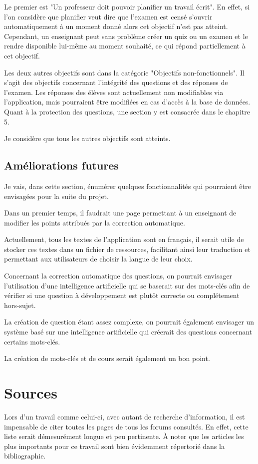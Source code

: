 Le premier est "Un professeur doit pouvoir planifier un travail écrit". En effet, si l'on considère que planifier veut dire que l'examen est censé s'ouvrir automatiquement à un moment donné alors cet objectif n'est pas atteint. Cependant, un enseignant peut sans problème créer un quiz ou un examen et le rendre disponible lui-même au moment souhaité, ce qui répond partiellement à cet objectif.

Les deux autres objectifs sont dans la catégorie "Objectifs non-fonctionnels". Il s'agit des objectifs concernant l'intégrité des questions et des réponses de l'examen. Les réponses des élèves sont actuellement non modifiables via l'application, mais pourraient être modifiées en cas d'accès à la base de données. Quant à la protection des questions, une section y est consacrée dans le chapitre 5.

Je considère que tous les autres objectifs sont atteints.

\subsection{Améliorations futures}
Je vais, dans cette section, énumérer quelques fonctionnalités qui pourraient être envisagées pour la suite du projet.

Dans un premier temps, il faudrait une page permettant à un enseignant de modifier les points attribués par la correction automatique.


Actuellement, tous les textes de l'application sont en français, il serait utile de stocker ces textes dans un fichier de ressources, facilitant ainsi leur traduction et permettant aux utilisateurs de choisir la langue de leur choix.

Concernant la correction automatique des questions, on pourrait envisager l'utilisation d'une intelligence artificielle qui se baserait sur des mots-clés afin de vérifier si une question à développement est plutôt correcte ou complétement hors-sujet.

La création de question étant assez complexe, on pourrait également envisager un système basé sur une intelligence artificielle qui créerait des questions concernant certains mots-clés.

La création de mots-clés et de cours serait également un bon point.

\section{Sources}
Lors d'un travail comme celui-ci, avec autant de recherche d'information, il est impensable de citer toutes les pages de tous les forums consultés. En effet, cette liste serait démesurément longue et peu pertinente. À noter que les articles les plus importants pour ce travail sont bien évidemment répertorié dans la bibliographie.


